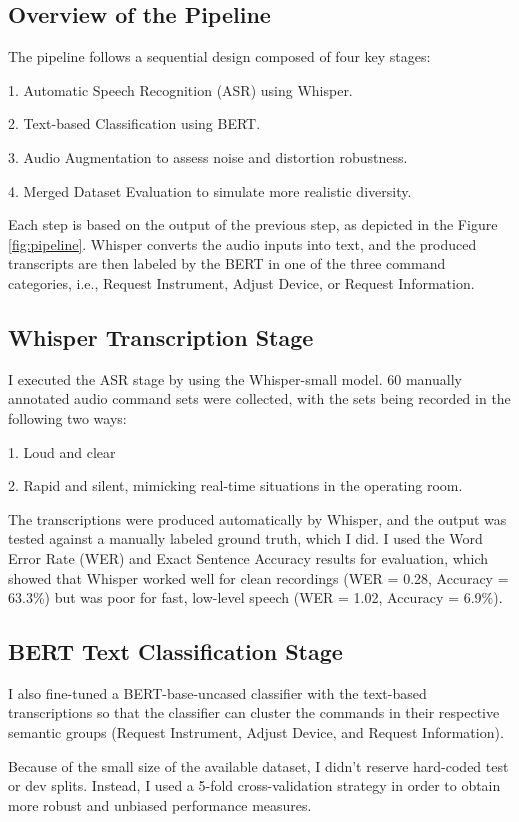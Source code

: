 \documentclass[11pt,a4paper]{article}
\begin{document}
\subsection{Overview of the Pipeline}
The pipeline follows a sequential design composed of four key stages:

1. Automatic Speech Recognition (ASR) using Whisper.

2. Text-based Classification using BERT.

3. Audio Augmentation to assess noise and distortion robustness.

4. Merged Dataset Evaluation to simulate more realistic diversity.

Each step is based on the output of the previous step, as depicted in the Figure \ref{fig:pipeline}. Whisper converts the audio inputs into text, and the produced transcripts are then labeled by the BERT in one of the three command categories, i.e., Request Instrument, Adjust Device, or Request Information.


\subsection{Whisper Transcription Stage}

I executed the ASR stage by using the Whisper-small model.
60 manually annotated audio command sets were collected, with the sets being recorded in the following two ways:


1. Loud and clear


2. Rapid and silent, mimicking real-time situations in the operating room.

The transcriptions were produced automatically by Whisper, and the output was tested against a manually labeled ground truth, which I did. I used the Word Error Rate (WER) and Exact Sentence Accuracy results for evaluation, which showed that Whisper worked well for clean recordings (WER = 0.28, Accuracy = 63.3\%) but was poor for fast, low-level speech (WER = 1.02, Accuracy = 6.9\%).

\subsection{BERT Text Classification Stage}
I also fine-tuned a BERT-base-uncased classifier with the text-based transcriptions so that the classifier can cluster the commands in their respective semantic groups (Request Instrument, Adjust Device, and Request Information).

Because of the small size of the available dataset, I didn't reserve hard-coded test or dev splits. Instead, I used a 5-fold cross-validation strategy in order to obtain more robust and unbiased performance measures.
\end{document}
